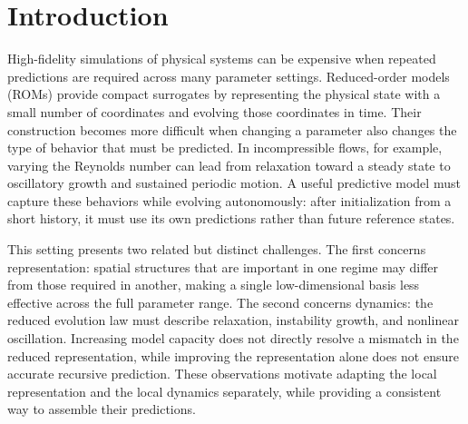 \documentclass{article}
\providecommand{\DIFaddtex}[1]{{\protect\color{blue} \sf #1}} %
\providecommand{\DIFdeltex}[1]{{\protect\color{red} \scriptsize #1}} %
\providecommand{\DIFaddbegin}{} %
\providecommand{\DIFaddend}{} %
\providecommand{\DIFdelend}{} %
\providecommand{\DIFadd}[1]{\texorpdfstring{\DIFaddtex{#1}}{#1}} %
\providecommand{\DIFdel}[1]{\texorpdfstring{\DIFdeltex{#1}}{}} %
\providecommand{\DIFaddincludegraphics}[2][]{{\color{blue}\fbox{\DIFOincludegraphics[#1]{#2}}}} %
\DeclareRobustCommand{\DIFaddbegin}{\DIFOaddbegin \let\includegraphics\DIFaddincludegraphics} %
\DeclareRobustCommand{\DIFaddend}{\DIFOaddend \let\includegraphics\DIFOincludegraphics} %
\DeclareRobustCommand{\DIFdelend}{\DIFOaddend \let\includegraphics\DIFOincludegraphics} %
\begin{document}
\begin{abstract}
\DIFdel{further improve prediction in regime overlaps. }\DIFdelend \DIFaddbegin \DIFadd{improves prediction in the evaluated overlaps. The framework targets adaptation across prescribed parameter regions, rather than online chart switching, and output fusion is not a guarantee of nonlinear physical consistency.
}\DIFaddend \end{abstract}

\section{Introduction}

High-fidelity simulations of physical systems can be expensive when repeated predictions are required across many parameter settings. Reduced-order models (ROMs) provide compact surrogates by representing the physical state with a small number of coordinates and evolving those coordinates in time. Their construction becomes more difficult when changing a parameter also changes the type of behavior that must be predicted. In incompressible flows, for example, varying the Reynolds number can lead from relaxation toward a steady state to oscillatory growth and sustained periodic motion. A useful predictive model must capture these behaviors while evolving autonomously: after initialization from a short history, it must use its own predictions rather than future reference states.

This setting presents two related but distinct challenges. The first concerns representation: spatial structures that are important in one regime may differ from those required in another, making a single low-dimensional basis less effective across the full parameter range. The second concerns dynamics: the reduced evolution law must describe relaxation, instability growth, and nonlinear oscillation. Increasing model capacity does not directly resolve a mismatch in the reduced representation, while improving the representation alone does not ensure accurate recursive prediction. These observations motivate adapting the local representation and the local dynamics separately, while providing a consistent way to assemble their predictions.
\end{document}

